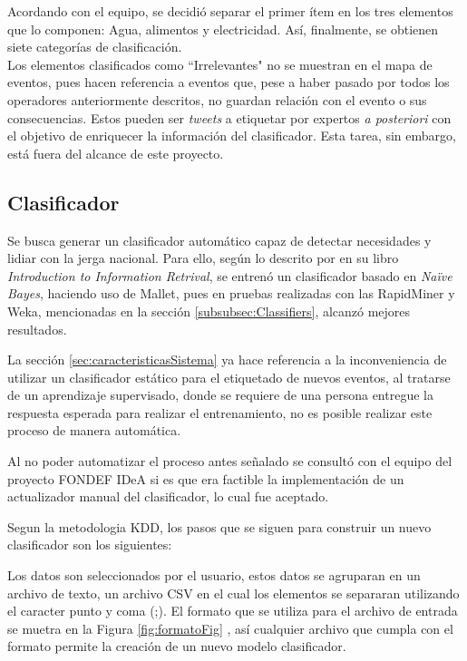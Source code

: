 Acordando con el equipo, se decidió separar el primer ítem en los tres elementos que lo componen: Agua, alimentos y electricidad. Así, finalmente, se obtienen siete categorías de clasificación.\\

Los elementos clasificados como ``Irrelevantes" no se muestran en el mapa de eventos, pues hacen referencia a eventos que, pese a haber pasado por todos los operadores anteriormente descritos, no guardan relación con el evento o sus consecuencias. Estos pueden ser \textit{tweets} a etiquetar por expertos \textit{a posteriori} con el objetivo de enriquecer la información del clasificador. Esta tarea, sin embargo, está fuera del alcance de este proyecto.

\subsection{Clasificador}
\label{sec:diseno:clasificador}

Se busca generar un clasificador automático capaz de detectar necesidades y lidiar con la jerga nacional. Para ello, según lo descrito por \cite{IRQE} en su libro \textit{Introduction to Information Retrival}, se entrenó un clasificador basado en \textit{Naïve Bayes}, haciendo uso de Mallet, pues en pruebas realizadas con las RapidMiner y Weka, mencionadas en la sección \ref{subsubsec:Classifiers}, alcanzó mejores resultados.

La sección \ref{sec:caracteristicasSistema} ya hace referencia a la inconveniencia de utilizar un clasificador estático para el etiquetado de nuevos eventos, al tratarse de un aprendizaje supervisado, donde se requiere de una persona entregue la respuesta esperada para realizar el entrenamiento, no es posible realizar este proceso de manera automática.

Al no poder automatizar el proceso antes señalado se consultó con el equipo del proyecto FONDEF IDeA si es que era factible la implementación de un actualizador manual del clasificador, lo cual fue aceptado.

Segun la metodologia KDD, los pasos que se siguen para construir un nuevo clasificador son los siguientes:

Los datos son seleccionados por el usuario, estos datos se agruparan en un archivo de texto, un archivo CSV en el cual los elementos se separaran utilizando el caracter punto y coma (;). El formato que se utiliza para el archivo de entrada se muetra en la Figura \ref{fig:formatoFig} , así cualquier archivo que cumpla con el formato permite la creación de un nuevo modelo clasificador.

